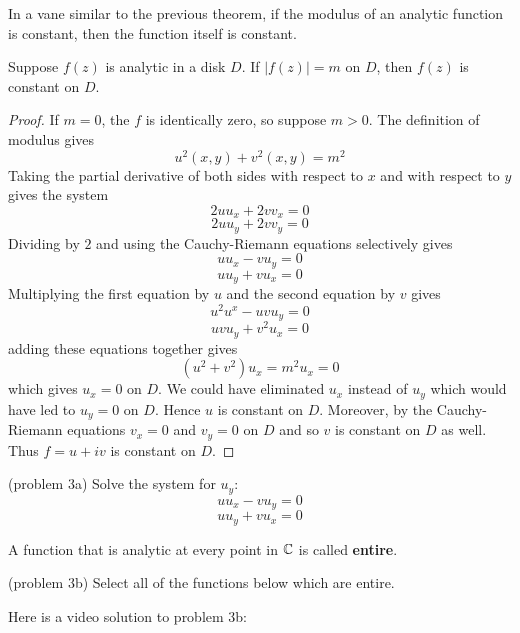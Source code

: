 \documentclass[handout]{ximera}
\begin{document}
In a vane similar to the previous theorem, if the modulus of an analytic function is constant, 
then the function itself is constant.

\begin{theorem}
Suppose $f(z)$ is analytic in a disk $D$. If $|f(z)| = m$ on  $D$, then $f(z)$ is constant on $D$.
\end{theorem}

\begin{proof}
If $m =0$, the $f$ is identically zero, so suppose $m>0$. The definition of modulus gives
\[
u^2(x,y) + v^2(x,y) = m^2
\]
Taking the partial derivative of both sides with respect to $x$ and with respect to $y$ gives the system
\[
2uu_x +2vv_x = 0
\]
\[
2uu_y + 2vv_y = 0
\]
Dividing by $2$ and using the Cauchy-Riemann equations selectively gives
\[
uu_x -vu_y = 0
\]
\[
uu_y + vu_x = 0
\]
Multiplying the first equation by $u$ and the second equation by $v$ gives
\[
u^2u^x - uvu_y=0
\]
\[
uvu_y + v^2u_x = 0
\]
adding these equations together gives
\[
\left(u^2 +v^2\right)u_x = m^2u_x = 0
\]
which gives $u_x = 0$ on $D$. We could have eliminated $u_x$ instead of $u_y$ which would 
have led to $u_y =0$ on $D$.
Hence $u$ is constant on $D$. Moreover, by the Cauchy-Riemann equations $v_x=0$ and $v_y=0$ on $D$ and 
so $v$ is constant on $D$ as well.
Thus $f = u+iv$ is constant on $D$.
\end{proof}

\begin{problem}(problem 3a)
Solve the system for $u_y$:
\[
uu_x -vu_y = 0
\]
\[
uu_y + vu_x = 0
\]
\begin{multipleChoice}
\end{multipleChoice}
\end{problem}


\begin{definition}
A function that is analytic at every point in $\mathbb C$ is called {\bf entire}.
\end{definition}


\begin{problem}(problem 3b)
Select all of the functions below which are entire.
\begin{selectAll}
\end{selectAll}
\end{problem}

Here is a video solution to problem 3b:\\
\begin{foldable}
\end{foldable}

\end{document}
